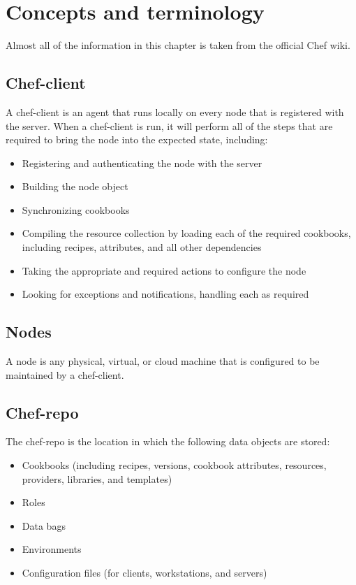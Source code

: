 \section{Concepts and terminology}

Almost all of the information in this chapter is taken from the official Chef wiki\cite{chef_wiki}.

\subsection{Chef-client}

A chef-client is an agent that runs locally on every node that is registered with the server. When a chef-client is run, it will perform all of the steps that are required to bring the node into the expected state, including:

\begin{itemize}
  \item Registering and authenticating the node with the server
  \item Building the node object
  \item Synchronizing cookbooks
  \item Compiling the resource collection by loading each of the required cookbooks, including recipes, attributes, and all other dependencies
  \item Taking the appropriate and required actions to configure the node
  \item Looking for exceptions and notifications, handling each as required
\end{itemize}

\subsection{Nodes}

A node is any physical, virtual, or cloud machine that is configured to be maintained by a chef-client.

\subsection{Chef-repo}

The chef-repo is the location in which the following data objects are stored:

\begin{itemize}
  \item Cookbooks (including recipes, versions, cookbook attributes, resources, providers, libraries, and templates)
  \item Roles
  \item Data bags
  \item Environments
  \item Configuration files (for clients, workstations, and servers)
\end{itemize}

